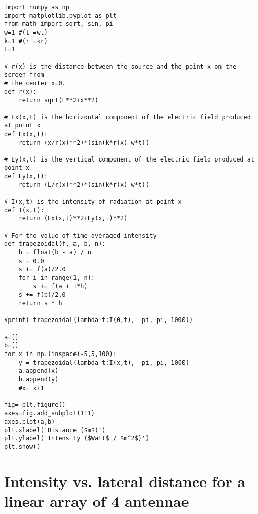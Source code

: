\begin{Verbatim}[fontsize=\small,baselinestretch=0.9]
import numpy as np
import matplotlib.pyplot as plt
from math import sqrt, sin, pi
w=1 #(t'=wt)
k=1 #(r'=kr)
L=1

# r(x) is the distance between the source and the point x on the screen from 
# the center x=0.
def r(x):
    return sqrt(L**2+x**2)

# Ex(x,t) is the horizontal component of the electric field produced at point x
def Ex(x,t):
    return (x/r(x)**2)*(sin(k*r(x)-w*t))

# Ey(x,t) is the vertical component of the electric field produced at point x
def Ey(x,t):
    return (L/r(x)**2)*(sin(k*r(x)-w*t))

# I(x,t) is the intensity of radiation at point x
def I(x,t):
    return (Ex(x,t)**2+Ey(x,t)**2)

# For the value of time averaged intensity
def trapezoidal(f, a, b, n):
    h = float(b - a) / n
    s = 0.0
    s += f(a)/2.0
    for i in range(1, n):
        s += f(a + i*h)
    s += f(b)/2.0
    return s * h

#print( trapezoidal(lambda t:I(0,t), -pi, pi, 1000))

a=[]
b=[]
for x in np.linspace(-5,5,100):
    y = trapezoidal(lambda t:I(x,t), -pi, pi, 1000)
    a.append(x)
    b.append(y)
    #x= x+1

fig= plt.figure()
axes=fig.add_subplot(111)
axes.plot(a,b)
plt.xlabel('Distance ($m$)')
plt.ylabel('Intensity ($Watt$ / $m^2$)')
plt.show()
\end{Verbatim}


\section{Intensity vs. lateral distance for a linear array of 4 antennae}\label{code:four}

